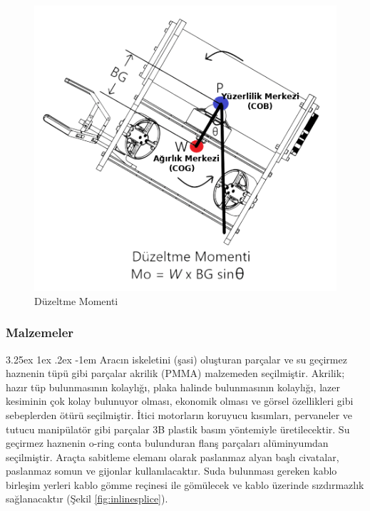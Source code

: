 \documentclass[12pt]{article}
\makeatletter
\renewcommand\paragraph{\@startsection{paragraph}{5}{\z@}%
  {3.25ex \@plus1ex \@minus.2ex}%
  {-1em}%
  {\normalfont\normalsize\bfseries}}
\makeatother
\begin{document}
\begin{figure}[hbt!]
\centering
 \begin{adjustbox}{width=10cm}
\includegraphics[width=1\textwidth]{moment.png}
 \end{adjustbox}
\caption{Düzeltme Momenti}
\label{fig:moment}
\end{figure}


\subsubsection{Malzemeler}

\paragraph{} Aracın iskeletini (şasi) oluşturan parçalar ve su geçirmez haznenin tüpü gibi parçalar akrilik (PMMA) malzemeden seçilmiştir. Akrilik; hazır tüp bulunmasının kolaylığı, plaka halinde bulunmasının kolaylığı, lazer kesiminin çok kolay bulunuyor olması, ekonomik olması ve görsel özellikleri gibi sebeplerden ötürü seçilmiştir. İtici motorların koruyucu kısımları, pervaneler ve tutucu manipülatör gibi parçalar 3B plastik basım yöntemiyle üretilecektir. Su geçirmez haznenin o-ring conta bulunduran flanş parçaları alüminyumdan seçilmiştir. Araçta sabitleme elemanı olarak paslanmaz alyan başlı civatalar, paslanmaz somun ve gijonlar kullanılacaktır. Suda bulunması gereken kablo birleşim yerleri kablo gömme reçinesi ile gömülecek ve kablo üzerinde  sızdırmazlık sağlanacaktır (Şekil \ref{fig:inlinesplice}).
\end{document}
